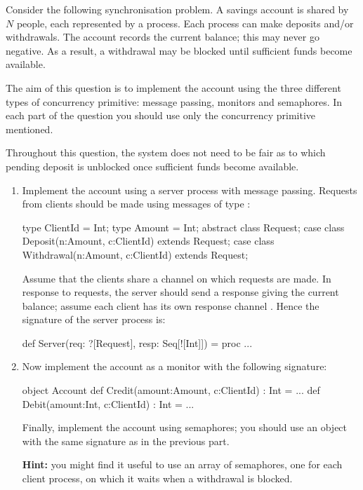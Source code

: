 \begin{question}
Consider the following synchronisation problem.  A savings account is shared
by $N$ people, each represented by a process.  Each process can make
deposits and/or withdrawals.  The account records the current balance; this
may never go negative.  As a result, a withdrawal may be blocked until
sufficient funds become available.  

The aim of this question is to implement the account using the three different
types of concurrency primitive: message passing, monitors and semaphores.  In
each part of the question you should use only the concurrency primitive
mentioned. 

Throughout this question, the system does not need to be fair as to which
pending deposit is unblocked once sufficient funds become available.


\begin{enumerate}
\item
Implement the account using a server process with message passing.  Requests
from clients should be made using messages of type :
\begin{scala}
  type ClientId = Int;
  type Amount = Int;
  abstract class Request;
  case class Deposit(n:Amount, c:ClientId) extends Request;
  case class Withdrawal(n:Amount, c:ClientId) extends Request;
\end{scala}
%
Assume that the clients share a channel  on which requests are
made.  In response to requests, the server should send a response giving the
current balance; assume each client  has its own response channel
.  Hence the signature of the server process is:
%
\begin{scala}
  def Server(req: ?[Request], resp: Seq[![Int]]) = proc{ ... }
\end{scala}


\item
Now implement the account as a monitor with the following signature:
%
\begin{scala}
object Account{
  def Credit(amount:Amount, c:ClientId) : Int = ...
  def Debit(amount:Int, c:ClientId) : Int = ...
}
\end{scala}

Finally, implement the account using semaphores; you should use an object with
the same signature as in the previous part.

{\bf Hint:} you might find it useful to use an array of semaphores, one for
each client process, on which it waits when a withdrawal is blocked.
\end{enumerate}
\end{question}

